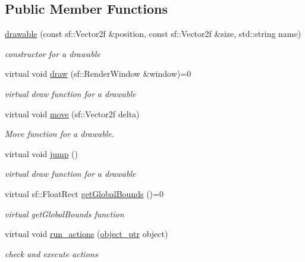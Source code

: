 \subsection*{Public Member Functions}
\begin{DoxyCompactItemize}
\item 
\hyperlink{classdrawable_a4e7881285581530d21b5c9fd59879b30}{drawable} (const sf\+::\+Vector2f \&position, const sf\+::\+Vector2f \&size, std\+::string name)
\begin{DoxyCompactList}\small\item\em constructor for a drawable \end{DoxyCompactList}\item 
virtual void \hyperlink{classdrawable_a4e49e2c1121704c83ce24c5f48dd910f}{draw} (sf\+::\+Render\+Window \&window)=0
\begin{DoxyCompactList}\small\item\em virtual draw function for a drawable \end{DoxyCompactList}\item 
virtual void \hyperlink{classdrawable_ad0d3930c045cc6776aa2c3965be32491}{move} (sf\+::\+Vector2f delta)
\begin{DoxyCompactList}\small\item\em Move function for a drawable. \end{DoxyCompactList}\item 
virtual void \hyperlink{classdrawable_ac39691470b7874f5dec59efe649d3981}{jump} ()
\begin{DoxyCompactList}\small\item\em virtual draw function for a drawable \end{DoxyCompactList}\item 
virtual sf\+::\+Float\+Rect \hyperlink{classdrawable_ae013ac0be47538be9ce885d6642daf73}{get\+Global\+Bounds} ()=0
\begin{DoxyCompactList}\small\item\em virtual get\+Global\+Bounds function \end{DoxyCompactList}\item 
virtual void \hyperlink{classdrawable_a715df01a318331e5611a2b0ad30109ff}{run\+\_\+actions} (\hyperlink{typedefs_8hpp_aab5add95f06d2ba25dbfed8eb07274fa}{object\+\_\+ptr} object)
\begin{DoxyCompactList}\small\item\em check and execute actions \end{DoxyCompactList}\item 

\end{DoxyCompactItemize}
